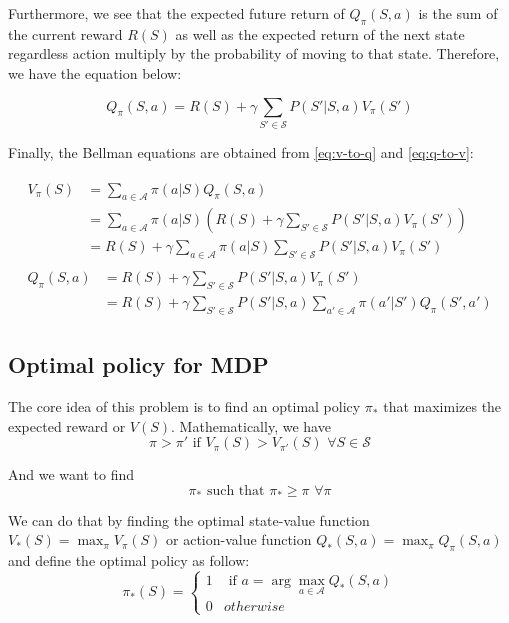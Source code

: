 \documentclass[
  a4paper, xcolor = usenames,dvipsnames]{article}
\begin{document}
Furthermore, we see that the expected future return of \(Q_{\pi}(S, a)\) is the sum of the current reward \(R(S)\) as well as the expected return of the next state regardless action multiply by the probability of moving to that state. Therefore, we have the equation below:

\begin{equation}
Q_{\pi}(S, a) = R(S) + \gamma \sum_{S' \in \mathcal{S}} P(S' | S, a) V_{\pi}(S')
\label{eq:q-to-v}
\end{equation}

Finally, the Bellman equations are obtained from \eqref{eq:v-to-q} and \eqref{eq:q-to-v}:

\begin{align}
\begin{split}
V_{\pi}(S) {}&= \sum_{a \in \mathcal{A}} \pi(a | S) Q_{\pi}(S, a) \\
  &= \sum_{a \in \mathcal{A}} \pi(a | S) (R(S) + \gamma \sum_{S' \in \mathcal{S}} P(S' | S, a) V_{\pi}(S')) \\
  &= R(S) + \gamma \sum_{a \in \mathcal{A}} \pi(a | S) \sum_{S' \in \mathcal{S}} P(S' | S, a) V_{\pi}(S')
\label{eq:bellman-v-1}
\end{split} \\
\begin{split}
Q_{\pi}(S, a) {}&= R(S) + \gamma \sum_{S' \in \mathcal{S}} P(S' | S, a) V_{\pi}(S') \\
  &= R(S) + \gamma \sum_{S' \in \mathcal{S}} P(S' | S, a) \sum_{a' \in \mathcal{A}} \pi(a' | S') Q_{\pi}(S', a')
\label{eq:bellman-q-1}
\end{split}
\end{align}

\hypertarget{optimal-policy-for-mdp}{%
\subsection{Optimal policy for MDP}\label{optimal-policy-for-mdp}}

The core idea of this problem is to find an optimal policy \(\pi_{*}\) that maximizes the expected reward or \(V(S)\). Mathematically, we have
\[
\pi > \pi' \text{ if } V_{\pi}(S) > V_{\pi'}(S) \,\, \forall S \in \mathcal{S}
\]

And we want to find
\[
\pi_{*} \text{ such that } \pi_{*} \ge \pi \,\, \forall \pi
\]

We can do that by finding the optimal state-value function \(V_{*}(S) = \max_{\pi} V_{\pi}(S)\) or action-value function \(Q_{*}(S, a) = \max_{\pi} Q_{\pi}(S, a)\) and define the optimal policy as follow:
\[
\pi_{*}(S) = \begin{cases}
1 & \text{ if } a = \arg\max_{a \in \mathcal{A}} Q_{*}(S, a) \\
0 & otherwise
\end{cases}
\]
\end{document}

